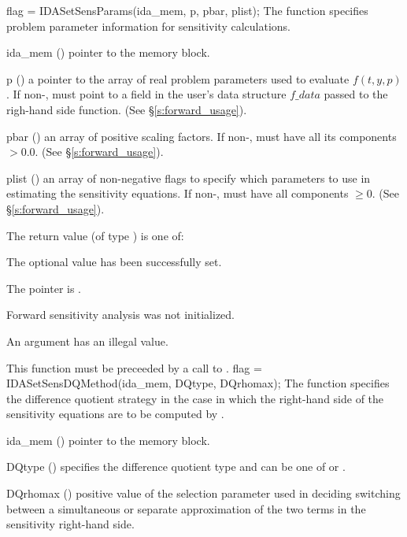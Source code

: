 {
  flag = IDASetSensParams(ida\_mem, p, pbar, plist);
}
{
  The function  specifies problem parameter information
  for sensitivity calculations.
}
{
  \begin{args}
  \item[ida\_mem] ()
    pointer to the {\idas} memory block.
  \item[p] ()
    a pointer to the array of real problem parameters used to evaluate $f(t,y,p)$.
    If non-,  must point to a field in the user's data structure
    $f\_data$ passed to the righ-hand side function.
    (See \S\ref{s:forward_usage}).
  \item[pbar] ()
    an array of  positive scaling factors. If non-,  must
    have all its components $> 0.0$.
    (See \S\ref{s:forward_usage}).
  \item[plist] () 
    an array of  non-negative flags to specify which parameters to use in
    estimating the sensitivity equations. If non-,  must
    have all components $\ge 0$.
    (See \S\ref{s:forward_usage}).
  \end{args}
}
{
  The return value  (of type ) is one of:
  \begin{args}
  \item[\Id{IDA\_SUCCESS}] 
    The optional value has been successfully set.
  \item[\Id{IDA\_MEM\_NULL}]
    The  pointer is .
  \item[\Id{IDA\_NO\_SENS}]
    Forward sensitivity analysis was not initialized.
  \item[\Id{IDA\_ILL\_INPUT}]
    An argument has an illegal value.
  \end{args}
}
{
  {\warn}This function must be preceeded by a call to .
}
{
  flag = IDASetSensDQMethod(ida\_mem, DQtype, DQrhomax);
}
{
  The function  specifies the difference quotient strategy in
  the case in which the right-hand side of the sensitivity equations are to
  be computed by {\idas}.
}
{
  \begin{args}
  \item[ida\_mem] ()
    pointer to the {\idas} memory block.
  \item[DQtype] ()
    specifies the difference quotient type and can be one of 
    or .
  \item[DQrhomax] ()
    positive value of the selection parameter used in deciding switching between a simultaneous
    or separate approximation of the two terms in the sensitivity right-hand side.
  \end{args}
}
